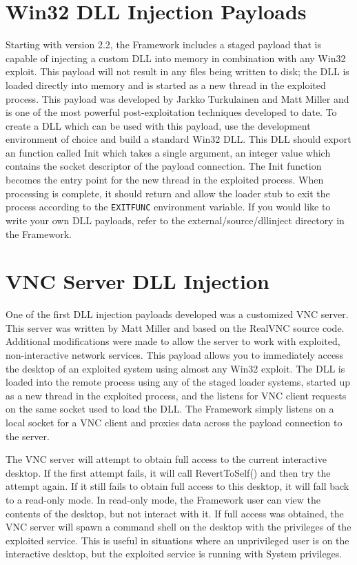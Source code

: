 \documentclass{report}
\begin{document}
\section{Win32 DLL Injection Payloads}
\par
Starting with version 2.2, the Framework includes a staged payload that is
capable of injecting a custom DLL into memory in combination with any Win32
exploit. This payload will not result in any files being written to disk; the
DLL is loaded directly into memory and is started as a new thread in the
exploited process. This payload was developed by Jarkko Turkulainen and Matt
Miller and is one of the most powerful post-exploitation techniques developed
to date. To create a DLL which can be used with this payload, use the
development environment of choice and build a standard Win32 DLL. This DLL
should export an function called Init which takes a single argument, an
integer value which contains the socket descriptor of the payload connection.
The Init function becomes the entry point for the new thread in the exploited
process. When processing is complete, it should return and allow the loader
stub to exit the process according to the \texttt{EXITFUNC} environment
variable. If you would like to write your own DLL payloads, refer to the
external/source/dllinject directory in the Framework. 

\section{VNC Server DLL Injection}
\par
One of the first DLL injection payloads developed was a customized VNC server.
This server was written by Matt Miller and based on the RealVNC source code.
Additional modifications were made to allow the server to work with exploited,
non-interactive network services. This payload allows you to immediately access
the desktop of an exploited system using almost any Win32 exploit. The DLL is
loaded into the remote process using any of the staged loader systems, started
up as a new thread in the exploited process, and the listens for VNC client
requests on the same socket used to load the DLL. The Framework simply listens
on a local socket for a VNC client and proxies data across the payload
connection to the server.  

\par
The VNC server will attempt to obtain full access to the current interactive
desktop. If the first attempt fails, it will call RevertToSelf() and then try
the attempt again. If it still fails to obtain full access to this desktop, it
will fall back to a read-only mode. In read-only mode, the Framework user can
view the contents of the desktop, but not interact with it. If full access was
obtained, the VNC server will spawn a command shell on the desktop with the
privileges of the exploited service. This is useful in situations where an
unprivileged user is on the interactive desktop, but the exploited service is
running with System privileges.  
\end{document}
